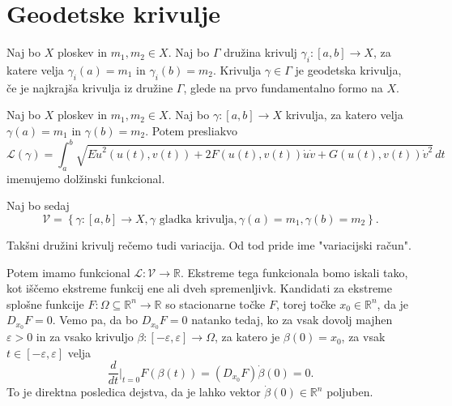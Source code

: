 \section{Geodetske krivulje}

\begin{definicija}
\label{def_geodetska_krivulja}
Naj bo $X$ ploskev in $m_1, m_2 \in X$. Naj bo $\Gamma$ družina krivulj $\gamma_i: [a,b] \to X$, za katere velja $\gamma_i(a) = m_1$ in $\gamma_i(b) = m_2$.
Krivulja $\gamma \in  \Gamma$ je geodetska krivulja, če je najkrajša krivulja iz družine $\Gamma$, glede na prvo fundamentalno formo na $X$. 
\end{definicija}

\begin{definicija}
\label{def_dolzinski_funkcional}
Naj bo $X$ ploskev in $m_1, m_2 \in X$. Naj bo $\gamma: [a,b] \to  X$ krivulja, za katero velja $\gamma(a) = m_1$ in $\gamma(b) = m_2$. Potem presliakvo \begin{equation*}
\mathcal{L}(\gamma) = \int_{a}^{b} \sqrt{E \dot{u}^2(u(t), v(t)) + 2F(u(t), v(t)) \dot{u} \dot{v} + G(u(t), v(t)) \dot{v}^2}  \, dt 
\end{equation*}  
imenujemo dolžinski funkcional.
\end{definicija}

Naj bo sedaj \begin{equation*}
\mathcal{V} = \left\{ \gamma: [a,b] \to  X, \gamma \text{ gladka krivulja}, \gamma(a) = m_1, \gamma(b) = m_2 \right\}. 
\end{equation*}
\begin{opomba}
Takšni družini krivulj rečemo tudi variacija. Od tod pride ime "variacijski račun".
\end{opomba}
Potem imamo funkcional $\mathcal{L}: \mathcal{V} \to  \mathbb{R}$. Ekstreme tega funkcionala bomo iskali tako, kot iščemo ekstreme
funkcij ene ali dveh spremenljivk. Kandidati za ekstreme splošne funkcije $F: \Omega \subseteq \mathbb{R}^n \to  \mathbb{R}$ so stacionarne točke $F$, torej
točke $x_0 \in \mathbb{R}^n$, da je $D_{x_0}F = 0$. Vemo pa, da bo $D_{x_0}F = 0$ natanko tedaj, ko za vsak dovolj majhen $\varepsilon > 0$ in za vsako krivuljo
$\beta: [- \varepsilon, \varepsilon] \to  \Omega$, za katero je $\beta(0) = x_0$, za vsak $t \in [-\varepsilon, \varepsilon]$ velja \begin{equation*}
\frac{d}{dt}  \bigg|_{t = 0} F(\beta(t)) = (D_{x_0}F) \dot{\beta}(0) = 0. 
\end{equation*}  
To je direktna posledica dejstva, da je lahko vektor $\dot{\beta}(0) \in  \mathbb{R}^n$ poljuben.

